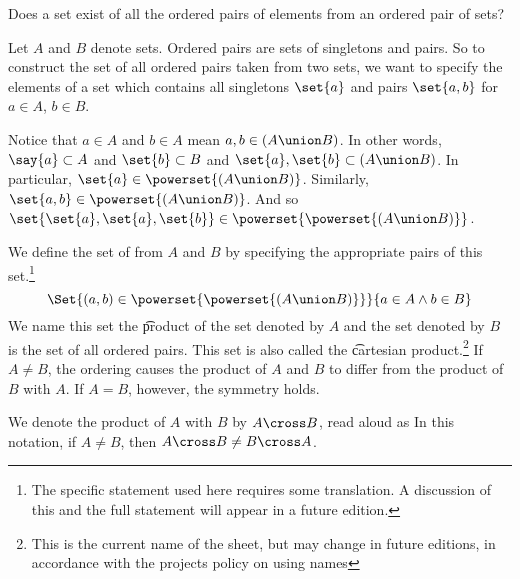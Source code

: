 

Does a set exist of all the ordered pairs of elements from an ordered pair of sets?


Let $A$ and $B$ denote sets.
Ordered pairs are sets of singletons and pairs.
So to construct the set of all ordered pairs taken from two sets, we want to specify the elements of a set which contains all singletons $\set{a}$ and pairs $\set{a, b}$ for $a \in A$, $b \in B$.

Notice that $a \in A$ and $b \in A$ mean $a, b \in (A \union B)$.
In other words, $\say{a} \subset A$ and $\set{b} \subset B$ and $\set{a}, \set{b} \subset (A \union B)$.
In particular, $\set{a} \in \powerset{(A \union B)}$.
Similarly, $\set{a, b} \in \powerset{(A \union B)}$.
And so $\set{\set{a}, \set{a}, \set{b}} \in \powerset{\powerset{(A \union B)}}$.

We define the set of  from $A$ and $B$ by specifying the appropriate pairs of this set.\footnote{The specific statement used here requires some translation. A discussion of this and the full statement will appear in a future edition.}
\[
  \Set{(a, b) \in \powerset{\powerset{(A \union B)}}}{a \in A \land b \in B}
\]
We name this set the \t{product} of the set denoted by $A$ and the set denoted by $B$ is the set of all ordered pairs.
This set is also called the \t{cartesian product}.\footnote{This is the current name of the sheet, but may change in future editions, in accordance with the projects policy on using names}
If $A \neq B$, the ordering causes the product of $A$ and $B$ to differ from the product of
$B$ with $A$.
If $A = B$, however, the symmetry holds.


We denote the product of $A$ with $B$ by $A \cross B$, read aloud as 
In this notation, if $A \neq B$, then $A \cross B \neq B \cross A$.
